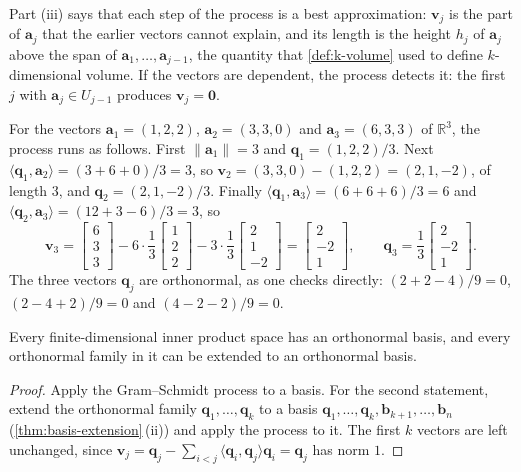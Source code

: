 Part (iii) says that each step of the process is a best approximation: $\mathbf v_j$ is the part of $\mathbf a_j$ that the earlier vectors cannot explain, and its length is the height $h_j$ of $\mathbf a_j$ above the span of $\mathbf a_1,\ldots,\mathbf a_{j-1}$, the quantity that \cref{def:k-volume} used to define $k$-dimensional volume. If the vectors are dependent, the process detects it: the first $j$ with $\mathbf a_j\in U_{j-1}$ produces $\mathbf v_j=\mathbf 0$.

For the vectors $\mathbf a_1=(1,2,2)$, $\mathbf a_2=(3,3,0)$ and $\mathbf a_3=(6,3,3)$ of $\mathbb R^3$, the process runs as follows. First $\|\mathbf a_1\|=3$ and $\mathbf q_1=(1,2,2)/3$. Next $\langle\mathbf q_1,\mathbf a_2\rangle=(3+6+0)/3=3$, so $\mathbf v_2=(3,3,0)-(1,2,2)=(2,1,-2)$, of length $3$, and $\mathbf q_2=(2,1,-2)/3$. Finally $\langle\mathbf q_1,\mathbf a_3\rangle=(6+6+6)/3=6$ and $\langle\mathbf q_2,\mathbf a_3\rangle=(12+3-6)/3=3$, so
\[
\mathbf v_3=\begin{bmatrix}6\\3\\3\end{bmatrix}-6\cdot\frac13\begin{bmatrix}1\\2\\2\end{bmatrix}-3\cdot\frac13\begin{bmatrix}2\\1\\-2\end{bmatrix}=\begin{bmatrix}2\\-2\\1\end{bmatrix},\qquad\mathbf q_3=\frac13\begin{bmatrix}2\\-2\\1\end{bmatrix}.
\]
The three vectors $\mathbf q_j$ are orthonormal, as one checks directly: $(2+2-4)/9=0$, $(2-4+2)/9=0$ and $(4-2-2)/9=0$.

\begin{corollary}
\label{cor:orthonormal-basis}
Every finite-dimensional inner product space has an orthonormal basis, and every orthonormal family in it can be extended to an orthonormal basis.
\end{corollary}

\begin{proof}
Apply the Gram--Schmidt process to a basis. For the second statement, extend the orthonormal family $\mathbf q_1,\ldots,\mathbf q_k$ to a basis $\mathbf q_1,\ldots,\mathbf q_k,\mathbf b_{k+1},\ldots,\mathbf b_n$ (\cref{thm:basis-extension}\,(ii)) and apply the process to it. The first $k$ vectors are left unchanged, since $\mathbf v_j=\mathbf q_j-\sum_{i<j}\langle\mathbf q_i,\mathbf q_j\rangle\mathbf q_i=\mathbf q_j$ has norm $1$.
\end{proof}

